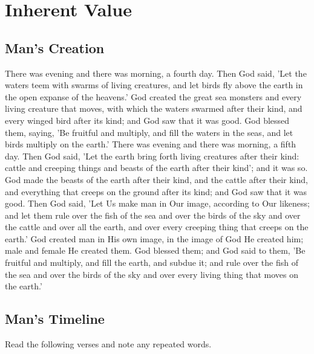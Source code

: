 \chapter{Inherent Value}

\section{Man's Creation}

\begin{scripture}[Gen 1:19--28]
    There was evening and there was morning, a fourth day.
        Then God said, 'Let the waters teem with swarms of living creatures, and let birds fly above the earth in the open expanse of the heavens.'
        God created the great sea monsters and every living creature that moves, with which the waters swarmed after their kind, and every winged bird after its kind; and God saw that it was good.
        God blessed them, saying, 'Be fruitful and multiply, and fill the waters in the seas, and let birds multiply on the earth.'
        There was evening and there was morning, a fifth day.
        Then God said, 'Let the earth bring forth living creatures after their kind: cattle and creeping things and beasts of the earth after their kind'; and it was so.
        God made the beasts of the earth after their kind, and the cattle after their kind, and everything that creeps on the ground after its kind; and God saw that it was good.
        Then God said, 'Let Us make man in Our image, according to Our likeness; and let them rule over the fish of the sea and over the birds of the sky and over the cattle and over all the earth, and over every creeping thing that creeps on the earth.'
        God created man in His own image, in the image of God He created him; male and female He created them.
        God blessed them; and God said to them, 'Be fruitful and multiply, and fill the earth, and subdue it; and rule over the fish of the sea and over the birds of the sky and over every living thing that moves on the earth.'
\end{scripture}



\newpage
\section{Man's Timeline}
Read the following verses and note any repeated words. 
\vspace{2\baselineskip}


